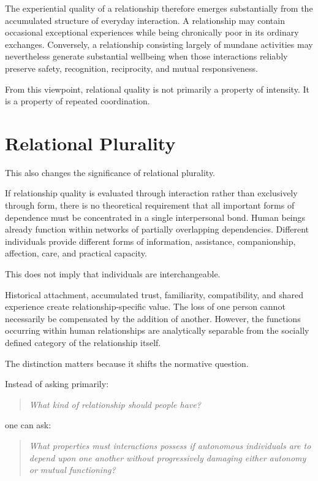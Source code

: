 \documentclass[11pt, a4paper]{article}
\begin{document}
The experiential quality of a relationship therefore emerges substantially from the accumulated structure of everyday interaction. A relationship may contain occasional exceptional experiences while being chronically poor in its ordinary exchanges. Conversely, a relationship consisting largely of mundane activities may nevertheless generate substantial wellbeing when those interactions reliably preserve safety, recognition, reciprocity, and mutual responsiveness.

From this viewpoint, relational quality is not primarily a property of intensity. It is a property of repeated coordination.

\section*{Relational Plurality}
This also changes the significance of relational plurality.

If relationship quality is evaluated through interaction rather than exclusively through form, there is no theoretical requirement that all important forms of dependence must be concentrated in a single interpersonal bond. Human beings already function within networks of partially overlapping dependencies. Different individuals provide different forms of information, assistance, companionship, affection, care, and practical capacity.

This does not imply that individuals are interchangeable.

Historical attachment, accumulated trust, familiarity, compatibility, and shared experience create relationship-specific value. The loss of one person cannot necessarily be compensated by the addition of another. However, the functions occurring within human relationships are analytically separable from the socially defined category of the relationship itself.

The distinction matters because it shifts the normative question.

Instead of asking primarily:
\begin{quote}
    \emph{What kind of relationship should people have?}
\end{quote}

one can ask:
\begin{quote}
    \emph{What properties must interactions possess if autonomous individuals are to depend upon one another without progressively damaging either autonomy or mutual functioning?}
\end{quote}
\end{document}
